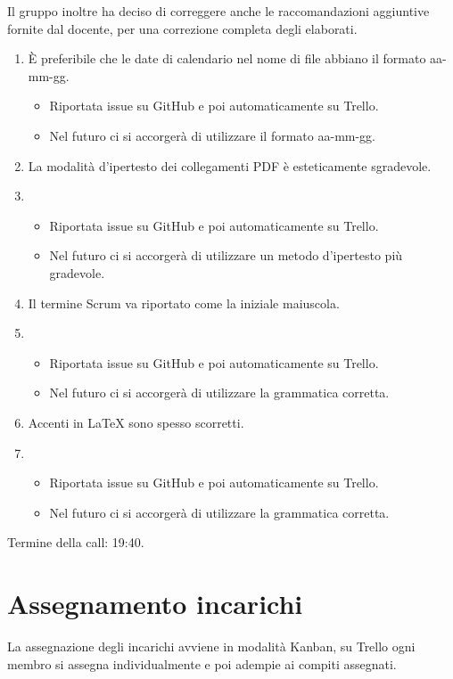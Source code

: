 Il gruppo inoltre ha deciso di correggere anche le raccomandazioni aggiuntive fornite dal docente, per
una correzione completa degli elaborati.
\begin{enumerate}
	\item È preferibile che le date di calendario nel nome di file abbiano il formato aa-mm-gg.
	\begin{itemize}
		\item Riportata issue su GitHub e poi automaticamente su Trello.
		\item Nel futuro ci si accorgerà di utilizzare il formato aa-mm-gg.
	\end{itemize}
	\item La modalità d'ipertesto dei collegamenti PDF è esteticamente sgradevole.
	\item \begin{itemize}
		\item Riportata issue su GitHub e poi automaticamente su Trello.
		\item Nel futuro ci si accorgerà di utilizzare un metodo d'ipertesto più gradevole.
	\end{itemize}
	\item Il termine Scrum va riportato come la iniziale maiuscola.
	\item \begin{itemize}
		\item Riportata issue su GitHub e poi automaticamente su Trello.
		\item Nel futuro ci si accorgerà di utilizzare la grammatica corretta.
	\end{itemize}
	\item Accenti in LaTeX sono spesso scorretti.
	\item \begin{itemize}
		\item Riportata issue su GitHub e poi automaticamente su Trello.
		\item Nel futuro ci si accorgerà di utilizzare la grammatica corretta.
	\end{itemize}
\end{enumerate}

\noindent Termine della call: 19:40.

\section{Assegnamento incarichi}
La assegnazione degli incarichi avviene in modalità Kanban, su Trello ogni membro si assegna individualmente e poi adempie ai compiti assegnati. 
